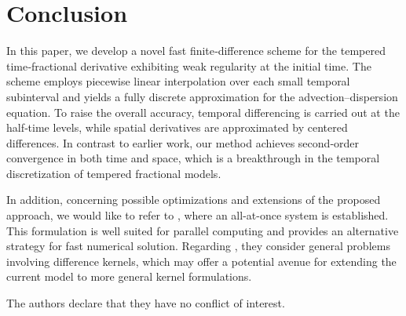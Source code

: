 \documentclass[10pt, reqno]{amsart}
\theoremstyle{remark}
\theoremstyle{definition}
\numberwithin{table}{section}
\begin{document}
\section{Conclusion}
In this paper,  we develop a novel fast finite‐difference scheme for the tempered time‐fractional derivative exhibiting weak regularity at the initial time.   The scheme employs piecewise linear interpolation over each small temporal subinterval and yields a fully discrete approximation for the advection–dispersion equation.   To raise the overall accuracy,  temporal differencing is carried out at the half‐time levels,  while spatial derivatives are approximated by centered differences.   In contrast to earlier work,  our method achieves second‐order convergence in both time and space,  which is a breakthrough in the temporal discretization of tempered fractional models.   

In addition, concerning possible optimizations and extensions of the proposed approach, we would like to refer to \cite{zhao2021}, where an all-at-once system is established. This formulation is well suited for parallel computing and provides an alternative strategy for fast numerical solution. Regarding \cite{Alikhanov2024_1,Alikhanov2024_2,Alikhanov2024_3,Vabishchevich2022,Vabishchevich2023}, they consider general problems involving difference kernels, which may offer a potential avenue for extending the current model to more general kernel formulations.
\vspace{18pt}


\vspace{12pt}

\;\;
 The authors declare that they have no conflict of interest. 


\vspace{18pt}
\end{document}
